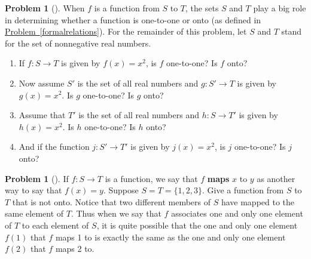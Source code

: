 \documentclass[10pt,]{book}
\newcommand{\terminology}[1]{\textbf{#1}}
\theoremstyle{plain}
\theoremstyle{definition}
\newtheorem{activity}[project]{Problem}
\theoremstyle{definition}
\numberwithin{equation}{chapter}
\begin{document}
\begin{activity}[]\marginsymbol[-1em]{} \label{activity-330}
\hypertarget{p-1859}{}%
When \(f\) is a function from \(S\) to \(T\), the sets \(S\) and \(T\) play a big role in determining whether a function is one-to-one or onto (as defined in \hyperref[formalrelations]{Problem~\ref{formalrelations}}). For the remainder of this problem, let \(S\) and \(T\) stand for  the set of nonnegative real numbers.%
\begin{enumerate}[font=\bfseries,label=(\alph*),ref=\alph*]
\item\label{task-240} \marginsymbol[-2.5em]{} \hypertarget{p-1860}{}%
If \(f:S\rightarrow T\) is given by \(f(x) =x^2\), is \(f\) one-to-one? Is \(f\) onto?%
\item\label{task-241} \marginsymbol[-2.5em]{} \hypertarget{p-1862}{}%
Now assume \(S'\) is the set of all real numbers and \(g:S'\rightarrow T\) is given by \(g(x) = x^2\). Is \(g\) one-to-one? Is \(g\) onto?%
\item\label{task-242} \marginsymbol[-2.5em]{} \hypertarget{p-1864}{}%
Assume that \(T'\) is the set of all real numbers and \(h:S\rightarrow T'\) is given by \(h(x) = x^2\). Is \(h\) one-to-one? Is \(h\) onto?%
\item\label{task-243} \marginsymbol[-2.5em]{} \hypertarget{p-1866}{}%
And if the function \(j:S'\rightarrow T'\) is given by \(j(x)=x^2\), is \(j\) one-to-one? Is \(j\) onto?%
\end{enumerate}
\end{activity}
\begin{activity}[]\marginsymbol[-1em]{} \label{activity-331}
\hypertarget{p-1868}{}%
If \(f:S\rightarrow T\) is a function, we say that \(f\) \terminology{maps} \(x\) to \(y\) as another way to say that \(f(x)=y\). Suppose \(S=T=\{1,2,3\}\). Give a function from \(S\) to \(T\) that is not onto. Notice that two different members of \(S\) have mapped to the same element of \(T\). Thus when we say that \(f\) associates one and only one element of \(T\) to each element of \(S\), it is quite possible that the one and only one element \(f(1)\) that \(f\) maps 1 to is exactly the same as the one and only one element \(f(2)\) that \(f\) maps 2 to.%
\end{activity}
\typeout{************************************************}
\typeout{************************************************}
\end{document}
